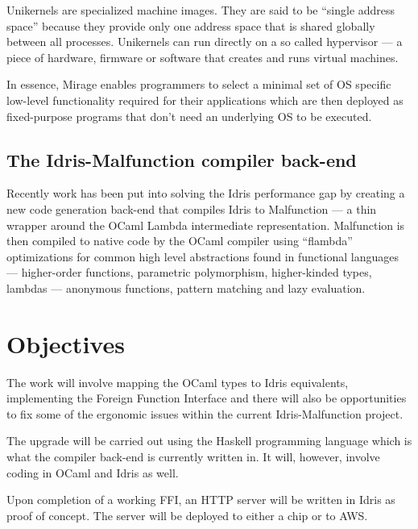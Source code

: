 \documentclass[a4paper]{report}
\begin{document}
Unikernels are specialized machine images.
They are said to be ``single address space'' because they provide only one
address space that is shared globally between all processes.
Unikernels can run directly on a so called hypervisor --- a piece of hardware,
firmware or software that creates and runs virtual machines.

In essence, Mirage enables programmers to select a minimal set of OS specific
low-level functionality required for their applications which are then deployed
as fixed-purpose programs that don't need an underlying OS to be executed.

\subsection{The Idris-Malfunction compiler back-end}
Recently work has been put into solving the Idris performance gap by creating a
new code generation back-end that compiles Idris to Malfunction --- a thin
wrapper around the OCaml Lambda intermediate representation.
Malfunction is then compiled to native code by the OCaml compiler using
``flambda'' optimizations for common high level abstractions found in functional languages --- higher-order functions, parametric polymorphism,
higher-kinded types, lambdas --- anonymous functions, pattern matching and
lazy evaluation.




\section{Objectives}

The work will involve mapping the OCaml types to Idris equivalents,
implementing the Foreign Function Interface and there will also be
opportunities to fix some of the ergonomic issues within the current
Idris-Malfunction project.

The upgrade will be carried out using the Haskell programming language which is
what the compiler back-end is currently written in.
It will, however, involve coding in OCaml and Idris as well.

Upon completion of a working FFI, an HTTP server will be written in Idris as
proof of concept.
The server will be deployed to either a chip or to AWS.
\end{document}
